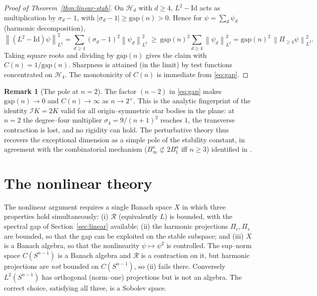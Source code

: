 \documentclass[11pt,reqno]{amsart}
\theoremstyle{plain}
\theoremstyle{definition}
\newtheorem{remark}[theorem]{Remark}
\newcommand{\Sph}{S^{n-1}}
\newcommand{\Rad}{\mathcal{R}}
\newcommand{\IB}{\mathcal{I}}
\newcommand{\Hd}[1]{\mathcal{H}_{#1}}
\newcommand{\norm}[1]{\left\lVert #1 \right\rVert}
\newcommand{\abs}[1]{\left\lvert #1 \right\rvert}
\begin{document}
\begin{proof}[Proof of Theorem~\ref{thm:linear-stab}]
On $\Hd d$ with $d\ge4$, $L^2-\mathrm{Id}$ acts as multiplication by
$\sigma_d-1$, with $\abs{\sigma_d-1}\ge \mathrm{gap}(n)>0$. Hence for
$\psi=\sum_{d}\psi_d$ (harmonic decomposition),
\[
   \norm{(L^2-\mathrm{Id})\psi}_{L^2}^2
   =\sum_{d\ge4}(\sigma_d-1)^2\norm{\psi_d}_{L^2}^2
   \ \ge\ \mathrm{gap}(n)^2\sum_{d\ge4}\norm{\psi_d}_{L^2}^2
   =\mathrm{gap}(n)^2\,\norm{\Pi_{\ge4}\psi}_{L^2}^2 .
\]
Taking square roots and dividing by $\mathrm{gap}(n)$ gives the claim with
$C(n)=1/\mathrm{gap}(n)$. Sharpness is attained (in the limit) by test
functions concentrated on $\Hd 4$. The monotonicity of $C(n)$ is immediate
from \eqref{eq:gap}.
\end{proof}

\begin{remark}[The pole at $n=2$]
The factor $(n-2)$ in \eqref{eq:gap} makes $\mathrm{gap}(n)\to0$ and
$C(n)\to\infty$ as $n\to2^+$. This is the analytic fingerprint of the identity
$\IB K=2K$ valid for all origin--symmetric star bodies in the plane: at $n=2$
the degree--four multiplier $\sigma_4=9/(n+1)^2$ reaches $1$, the transverse
contraction is lost, and no rigidity can hold. The perturbative theory thus
recovers the exceptional dimension as a simple pole of the stability constant,
in agreement with the combinatorial mechanism ($B_\infty^n\not\subset 2B_1^n$
iff $n\ge3$) identified in \cite{MSY2025}.
\end{remark}

\section{The nonlinear theory}\label{sec:nonlinear}

The nonlinear argument requires a single Banach space $X$ in which three
properties hold simultaneously: (i) $\Rad$ (equivalently $L$) is bounded, with
the spectral gap of Section~\ref{sec:linear} available; (ii) the harmonic
projections $\Pi_c,\Pi_s$ are bounded, so that the gap can be exploited on the
stable subspace; and (iii) $X$ is a Banach algebra, so that the nonlinearity
$\psi\mapsto\psi^2$ is controlled. The sup--norm space $C(\Sph)$ is a Banach
algebra and $\Rad$ is a contraction on it, but harmonic projections are
\emph{not} bounded on $C(\Sph)$, so (ii) fails there. Conversely $L^2(\Sph)$
has orthogonal (norm--one) projections but is not an algebra. The correct
choice, satisfying all three, is a Sobolev space.
\end{document}
